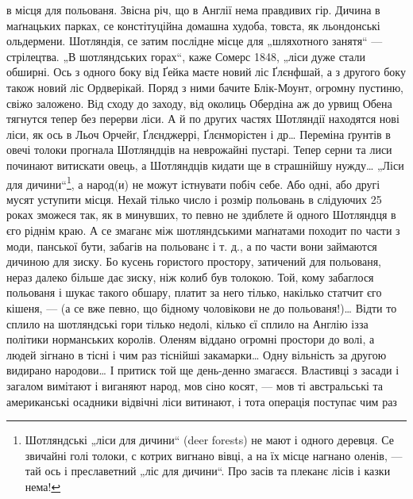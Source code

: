 \parcont{}
в місця для польованя. Звісна річ, що в Англії нема правдивих гір. Дичина в маґнацьких парках, се
констітуційна домашна худоба, товста, як льондонські ольдермени. Шотляндія, се затим послідне місце
для „шляхотного занятя“ — стрілецтва. „В шотляндських горах“, каже Сомерс 1848, „ліси дуже стали
обширні. Ось з одного боку від Ґейка маєте новий ліс Ґлєнфшай, а з другого боку також новий ліс
Ордверікай. Поряд з ними бачите Блік-Моунт, огромну пустиню, свіжо заложено. Від сходу до заходу,
від околиць Обердіна аж до урвищ Обена тягнутся тепер без перерви ліси. А й по других частях
Шотляндії находятся нові ліси, як ось в Льоч Орчейґ, Ґлєнджеррі, Ґлєнморістен і др\dots{} Переміна
ґрунтів в овечі толоки прогнала Шотляндців на неврожайні пустарі. Тепер серни та лиси починают
витискати овець, а Шотляндців кидати ще в страшнійшу нужду\dots{} „Ліси для дичини“\footnote{
Шотляндські „ліси для дичини“ (deer forests) не мают і одного деревця. Се звичайні голі толоки,
с котрих вигнано вівці, а на їх місце нагнано оленів, — тай ось і преславетний „ліс для дичини“. Про
засів та плеканє лісів і казки нема!
}, а народ(и) не
можут істнувати побіч себе. Або одні, або другі мусят уступити місця. Нехай тілько число і розмір
польовань в слідуючих 25 роках зможеся так, як в минувших, то певно не здиблете й одного Шотляндця в
єго ріднім краю. А се змаганє між шотляндськими маґнатами походит по части з моди, панської бути,
забагів на польованє і т. д., а по части вони займаются дичиною для зиску. Бо кусень гористого
простору, затичений для польованя, нераз далеко більше дає зиску, ніж колиб був толокою. Той, кому
забаглося польованя і шукає такого обшару, платит за него тілько, накілько статчит єго кішеня,
— (а се вже певно, що бідному чоловікови не до польованя!)\dots{} Відти то сплило на шотляндські гори
тілько недолі, кілько єї сплило на Англію ізза політики норманських
королів. Оленям віддано огромні простори до волі, а людей зігнано в тісні і чим раз тіснійші
закамарки\dots{} Одну вільність за другою видирано народови\dots{} І притиск той ще
день-денно змагаєся. Властивці з засади і загалом вимітают і виганяют народ, мов сіно косят, — мов
ті австральські та американські осадники відвічні ліси витинают, і тота операція поступає чим раз
